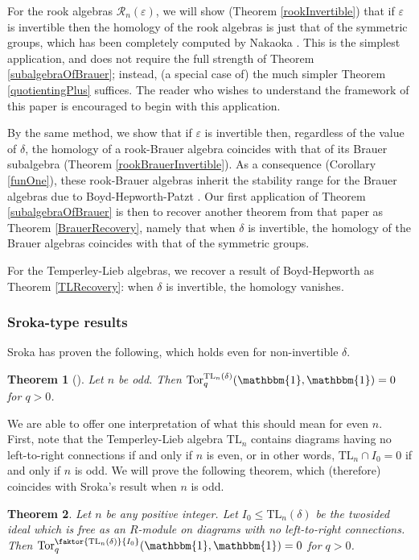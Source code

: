 \documentclass[12pt]{amsart}
\theoremstyle{plain}
\newtheorem{theorem}{Theorem}[section]
\theoremstyle{definition} \newtheorem{definition}[theorem]{Definition}
\theoremstyle{plain}
\theoremstyle{plain} \newtheorem{proposition}[theorem]{Proposition}
\theoremstyle{plain} \newtheorem{conjecture}[theorem]{Conjecture}
\theoremstyle{plain} \newtheorem{corollary}[theorem]{Corollary}
\theoremstyle{remark} \newtheorem{claim}[theorem]{Claim}
\theoremstyle{remark} \newtheorem{remark}[theorem]{Remark}
\theoremstyle{remark} \newtheorem{example}[theorem]{Example}
\theoremstyle{remark} \newtheorem{comment}[theorem]{Comment}
\theoremstyle{definition} \newtheorem{question}[theorem]{Question}
\renewcommand{\t}{\mathbbm{1}}
\newcommand{\rook}{\mathcal{R}}
\newcommand{\Tor}{\mathrm{Tor}}
\newcommand{\TL}{\mathrm{TL}}
\begin{document}
For the rook algebras $\rook_n(\varepsilon)$, we will show (Theorem \ref{rookInvertible}) that if $\varepsilon$ is invertible then the homology of the rook algebras is just that of the symmetric groups, which has been completely computed by Nakaoka \cite{Nakaoka}. This is the simplest application, and does not require the full strength of Theorem \ref{subalgebraOfBrauer}; instead, (a special case of) the much simpler Theorem \ref{quotientingPlus} suffices. The reader who wishes to understand the framework of this paper is encouraged to begin with this application.

By the same method, we show that if $\varepsilon$ is invertible then, regardless of the value of $\delta$, the homology of a rook-Brauer algebra coincides with that of its Brauer subalgebra (Theorem \ref{rookBrauerInvertible}). As a consequence (Corollary \ref{funOne}), these rook-Brauer algebras inherit the stability range for the Brauer algebras due to Boyd-Hepworth-Patzt \cite{BHP}. Our first application of Theorem \ref{subalgebraOfBrauer} is then to recover another theorem from that paper as Theorem \ref{BrauerRecovery}, namely that when $\delta$ is invertible, the homology of the Brauer algebras coincides with that of the symmetric groups.

For the Temperley-Lieb algebras, we recover a result of Boyd-Hepworth as Theorem \ref{TLRecovery}: when $\delta$ is invertible, the homology vanishes.

\subsubsection{Sroka-type results}

Sroka \cite{Sroka} has proven the following, which holds even for non-invertible $\delta$.

\begin{theorem}[\cite{Sroka}] \label{theoremSroka} Let $n$ be odd. Then $\Tor^{\TL_n(\delta)}_q(\t,\t)=0$ for $q>0$. \end{theorem}

We are able to offer one interpretation of what this should mean for even $n$. First, note that the Temperley-Lieb algebra $\TL_n$ contains diagrams having no left-to-right connections if and only if $n$ is even, or in other words, $\TL_n \cap I_0 = 0$ if and only if $n$ is odd. We will prove the following theorem, which (therefore) coincides with Sroka's result when $n$ is odd.

\begin{theorem} \label{generalisedSroka} Let $n$ be any positive integer. Let $I_0 \leq \TL_n(\delta)$ be the twosided ideal which is free as an $R$-module on diagrams with no left-to-right connections. Then $\Tor^{\faktor{\TL_n(\delta)}{I_0}}_q(\t,\t)=0$ for $q>0$. \end{theorem}
\end{document}
